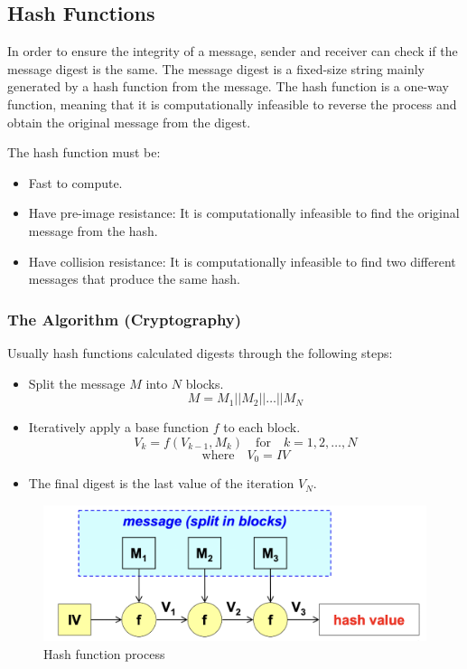\subsection{Hash Functions}

In order to ensure the integrity of a message, sender and receiver can check if the message digest is the same. The message digest is a fixed-size string mainly generated by a hash function from the message. The hash function is a one-way function, meaning that it is computationally infeasible to reverse the process and obtain the original message from the digest.

\vspace{0.1cm}

\noindent The hash function must be:
\begin{itemize}
    \item Fast to compute.
    \item Have pre-image resistance: It is computationally infeasible to find the original message from the hash.
    \item Have collision resistance: It is computationally infeasible to find two different messages that produce the same hash.
\end{itemize}

\begin{center}
    \subsubsection*{The Algorithm (Cryptography)}
\end{center}
Usually hash functions calculated digests through the following steps:
\begin{itemize}
    \item Split the message $M$ into $N$ blocks.
    \[
        M = M_1 || M_2 || \dots || M_N
    \]
    \item Iteratively apply a base function $f$ to each block.
    \[
        V_k = f(V_{k-1}, M_k) \quad \text{for} \quad k=1,2,\dots,N
    \]
    \[  
        \text{where} \quad V_0 = IV
    \]
    \item The final digest is the last value of the iteration $V_N$.
\end{itemize}

\begin{figure}[H]
    \centering
    \includegraphics[width=0.8\linewidth]{Images/Cryptography/hash_f.png}
    \caption{Hash function process}
\end{figure}

